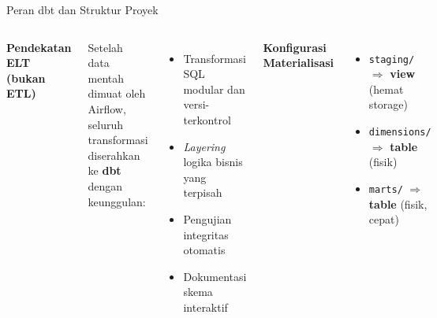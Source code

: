 \documentclass[xcolor=table,t,aspectratio=169]{beamer}
\begin{document}
\begin{frame}{Peran dbt dan Struktur Proyek}
  \footnotesize
  \begin{columns}[T]
    \textbf{Pendekatan ELT (bukan ETL)}
    \vspace{4pt}

    Setelah data mentah dimuat oleh Airflow, seluruh transformasi diserahkan ke \textbf{dbt} dengan keunggulan:
    \begin{itemize}
      \scriptsize
      \item Transformasi SQL modular dan versi-terkontrol
      \item \textit{Layering} logika bisnis yang terpisah
      \item Pengujian integritas otomatis
      \item Dokumentasi skema interaktif
    \end{itemize}

    \vspace{6pt}
    \textbf{Konfigurasi Materialisasi}
    \begin{itemize}
      \scriptsize
      \item \texttt{staging/} $\Rightarrow$ \textbf{view} (hemat storage)
      \item \texttt{dimensions/} $\Rightarrow$ \textbf{table} (fisik)
      \item \texttt{marts/} $\Rightarrow$ \textbf{table} (fisik, cepat)
    \end{itemize}


\end{columns}
\end{frame}
\end{document}

